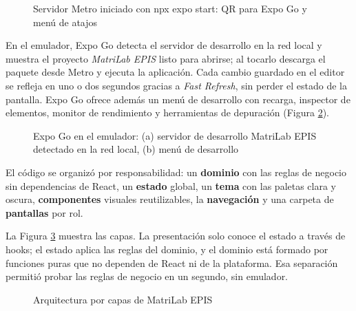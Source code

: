 \begin{figure}[!htbp]
\centering
{}
\caption{Servidor Metro iniciado con npx expo start: QR para Expo Go y menú de atajos}
\label{fig:metro}
\end{figure}

En el emulador, Expo Go detecta el servidor de desarrollo en la red local y muestra el proyecto \textit{MatriLab EPIS} listo para abrirse; al tocarlo descarga el paquete desde Metro y ejecuta la aplicación. Cada cambio guardado en el editor se refleja en uno o dos segundos gracias a \textit{Fast Refresh}, sin perder el estado de la pantalla. Expo Go ofrece además un menú de desarrollo con recarga, inspector de elementos, monitor de rendimiento y herramientas de depuración (Figura \ref{fig:entorno}).

\begin{figure}[!htbp]
\centering
{}
\caption{Expo Go en el emulador: (a) servidor de desarrollo MatriLab EPIS detectado en la red local, (b) menú de desarrollo}
\label{fig:entorno}
\end{figure}

El código se organizó por responsabilidad: un \textbf{dominio} con las reglas de negocio sin dependencias de React, un \textbf{estado} global, un \textbf{tema} con las paletas clara y oscura, \textbf{componentes} visuales reutilizables, la \textbf{navegación} y una carpeta de \textbf{pantallas} por rol.

\vspace{0.2cm}

La Figura \ref{fig:arquitectura} muestra las capas. La presentación solo conoce el estado a través de hooks; el estado aplica las reglas del dominio, y el dominio está formado por funciones puras que no dependen de React ni de la plataforma. Esa separación permitió probar las reglas de negocio en un segundo, sin emulador.

\begin{figure}[!htbp]
\centering
{}
\caption{Arquitectura por capas de MatriLab EPIS}
\label{fig:arquitectura}
\end{figure}

